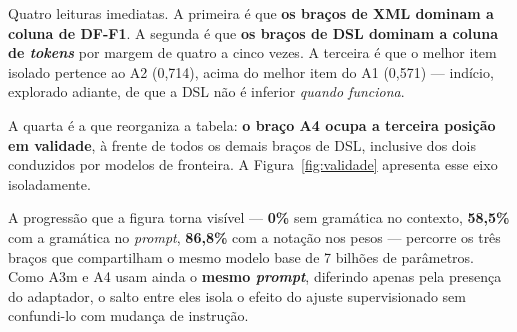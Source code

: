 \begin{table}[h!]
\end{table}

Quatro leituras imediatas. A primeira é que \textbf{os braços de XML dominam a coluna de DF-F1}. A segunda é que \textbf{os braços de DSL dominam a coluna de \textit{tokens}} por margem de quatro a cinco vezes. A terceira é que o melhor item isolado pertence ao A2 (0,714), acima do melhor item do A1 (0,571) --- indício, explorado adiante, de que a DSL não é inferior \textit{quando funciona}.

A quarta é a que reorganiza a tabela: \textbf{o braço A4 ocupa a terceira posição em validade}, à frente de todos os demais braços de DSL, inclusive dos dois conduzidos por modelos de fronteira. A Figura~\ref{fig:validade} apresenta esse eixo isoladamente.



A progressão que a figura torna visível --- \textbf{0\%} sem gramática no contexto, \textbf{58,5\%} com a gramática no \textit{prompt}, \textbf{86,8\%} com a notação nos pesos --- percorre os três braços que compartilham o mesmo modelo base de 7 bilhões de parâmetros. Como A3m e A4 usam ainda o \textbf{mesmo \textit{prompt}}, diferindo apenas pela presença do adaptador, o salto entre eles isola o efeito do ajuste supervisionado sem confundi-lo com mudança de instrução.

